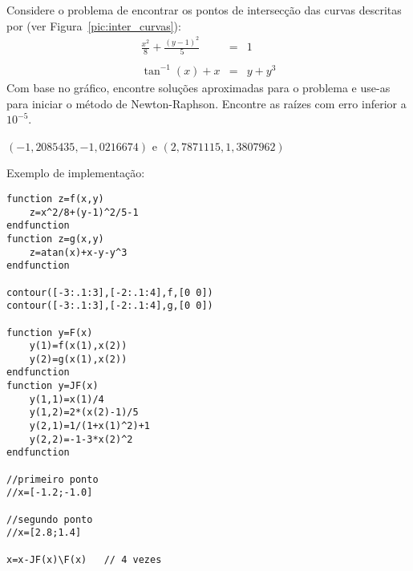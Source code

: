 \begin{exer}  Considere o problema de encontrar os pontos de intersecção das curvas descritas por (ver Figura~\ref{pic:inter_curvas}):
\begin{eqnarray}
\frac{x^2}{8}+\frac{(y-1)^2}{5}&=&1\\~\\
\tan^{-1}(x)+x&=&y+y^3
\end{eqnarray}
 Com base no gráfico, encontre soluções aproximadas para o problema e use-as para iniciar o método de Newton-Raphson. Encontre as raízes com erro inferior a $10^{-5}$.
\end{exer}
\begin{resp}
$\left(-1,2085435, -1,0216674 \right)$ e $\left(2,7871115, 1,3807962\right)$

\ifisscilab
Exemplo de implementação:
\begin{verbatim}
function z=f(x,y)
    z=x^2/8+(y-1)^2/5-1
endfunction
function z=g(x,y)
    z=atan(x)+x-y-y^3
endfunction

contour([-3:.1:3],[-2:.1:4],f,[0 0])
contour([-3:.1:3],[-2:.1:4],g,[0 0])

function y=F(x)
    y(1)=f(x(1),x(2))
    y(2)=g(x(1),x(2))
endfunction
function y=JF(x)
    y(1,1)=x(1)/4
    y(1,2)=2*(x(2)-1)/5
    y(2,1)=1/(1+x(1)^2)+1
    y(2,2)=-1-3*x(2)^2
endfunction

//primeiro ponto
//x=[-1.2;-1.0]

//segundo ponto
//x=[2.8;1.4]

x=x-JF(x)\F(x)   // 4 vezes
\end{verbatim}
\fi
\end{resp}


